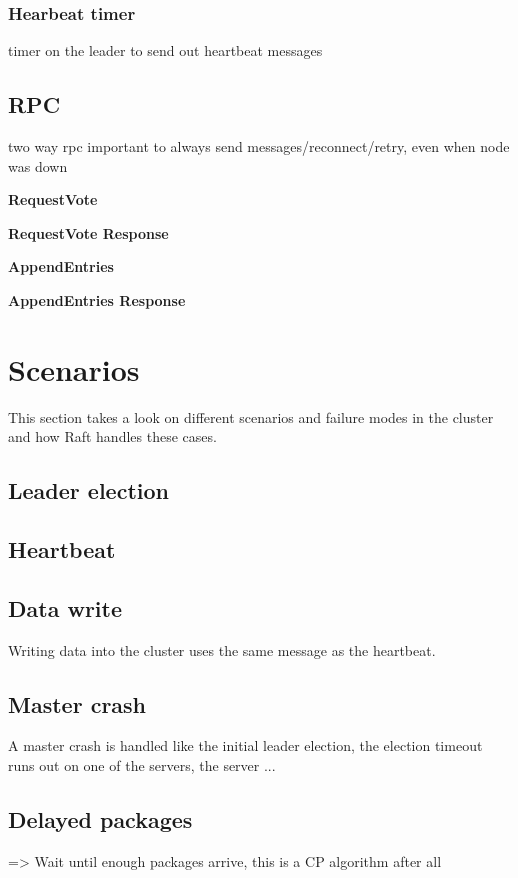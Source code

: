 \subsubsection*{Hearbeat timer}
timer on the leader to send out heartbeat messages

\subsection{RPC}

two way rpc
important to always send messages/reconnect/retry, even when node was down

\textbf{RequestVote}

\textbf{RequestVote Response}

\textbf{AppendEntries}

\textbf{AppendEntries Response}

\section{Scenarios}
This section takes a look on different scenarios and failure modes in the cluster and how Raft handles these cases.

\subsection{Leader election}

\subsection{Heartbeat}

\subsection{Data write}
Writing data into the cluster uses the same message as the heartbeat.


\subsection{Master crash}
A master crash is handled like the initial leader election, the election timeout runs out on one of the servers, the server ...

\subsection{Delayed packages}
=> Wait until enough packages arrive, this is a CP algorithm after all

